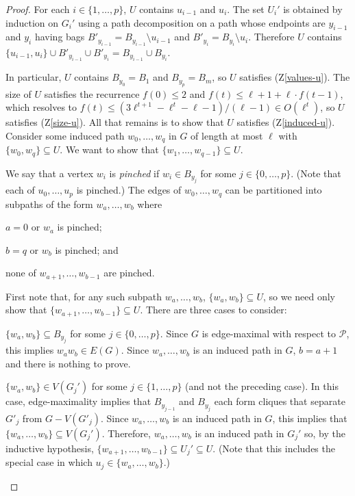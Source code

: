 \documentclass[kpfonts]{patmorin}
\theoremstyle{named}
\begin{document}
\begin{proof}
    For each $i\in\{1,\ldots,p\}$, $U$ contains $u_{i-1}$ and $u_i$.
    The set $U_i'$ is obtained by induction on $G_i'$ using a path decomposition on a path whose endpoints are $y_{i-1}$ and $y_i$ having bags $B'_{y_{i-1}}=B_{y_{i-1}}\setminus u_{i-1}$ and $B'_{y_{i}}=B_{y_{i}}\setminus u_{i}$.  Therefore $U$ contains $\{u_{i-1},u_i\}\cup B'_{y_{i-1}}\cup B'_{y_i}=B_{y_{i-1}}\cup B_{y_i}$.

    In particular, $U$ contains $B_{y_0}=B_1$ and $B_{y_p}=B_m$, so $U$ satisfies (Z\ref{values-u}). The size of $U$ satisfies the recurrence $f(0)\le 2$ and $f(t)\le \ell+1+\ell\cdot f(t-1)$, which resolves to $f(t)\le (3\ell^{t+1}-\ell^t-\ell-1)/(\ell-1) \in O(\ell^t)$, so $U$ satisfies (Z\ref{size-u}).  All that remains is to show that $U$ satisfies (Z\ref{induced-u}).  Consider some induced path $w_0,\ldots,w_q$ in $G$ of length at most $\ell$ with $\{w_0,w_q\}\subseteq U$.  We want to show that $\{w_1,\ldots,w_{q-1}\}\subseteq U$.

    We say that a vertex $w_i$ is \emph{pinched} if $w_i\in B_{y_j}$ for some $j\in\{0,\ldots,p\}$. (Note that each of $u_0,\ldots,u_p$ is pinched.) The edges of $w_0,\ldots,w_q$ can be partitioned into subpaths of the form $w_{a},\ldots,w_{b}$ where
    \begin{inparaenum}[(i)]
        \item $a=0$ or $w_a$ is pinched;
        \item $b=q$ or $w_b$ is pinched; and
        \item none of $w_{a+1},\ldots,w_{b-1}$ are pinched.
    \end{inparaenum}
    First note that, for any such subpath $w_a,\ldots,w_b$, $\{w_a,w_b\}\subseteq U$, so we need only show that $\{w_{a+1},\ldots,w_{b-1}\}\subseteq U$.  There are three cases to consider:

    \begin{compactenum}
       \item $\{w_a,w_b\}\subseteq B_{y_j}$ for some $j\in\{0,\ldots,p\}$.  Since $G$ is edge-maximal with respect to $\mathcal{P}$, this implies  $w_aw_b\in E(G)$. Since $w_a,\ldots,w_b$ is an induced path in $G$, $b=a+1$ and there is nothing to prove.

       \item $\{w_a,w_b\}\in V(G_j')$ for some $j\in\{1,\ldots,p\}$ (and not the preceding case). In this case, edge-maximality implies that $B_{y_{j-1}}$ and $B_{y_{j}}$ each form cliques that separate $G'_{j}$ from $G-V(G'_j)$.  Since $w_a,\ldots,w_b$ is an induced path in $G$, this implies that $\{w_a,\ldots,w_b\}\subseteq V(G_j')$.  Therefore, $w_a,\ldots,w_b$ is an induced path in $G_j'$ so, by the inductive hypothesis, $\{w_{a+1},\ldots,w_{b-1}\}\subseteq U_j'\subseteq U$.  (Note that this includes the special case in which $u_j\in\{w_a,\ldots,w_b\}$.)


\end{compactenum}
\end{proof}
\end{document}
